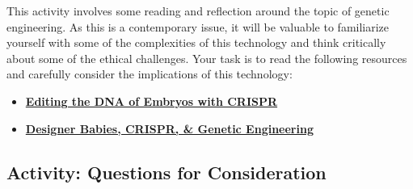 \documentclass[
]{book}
\providecommand{\tightlist}{%
  \setlength{\itemsep}{0pt}\setlength{\parskip}{0pt}}
\begin{document}
\begin{reflect}
This activity involves some reading and reflection around the topic of genetic engineering. As this is a contemporary issue, it will be valuable to familiarize yourself with some of the complexities of this technology and think critically about some of the ethical challenges. Your task is to read the following resources and carefully consider the implications of this technology:

\begin{itemize}
\tightlist
\item
  \href{https://www.statnews.com/2019/09/16/could-editing-the-dna-of-embryos-with-crispr-help-save-people-who-are-already-alive/}{\textbf{Editing the DNA of Embryos with CRISPR}}
\item
  \href{https://www.geneticsandsociety.org/internal-content/designer-babies-crispr-genetic-engineering}{\textbf{Designer Babies, CRISPR, \& Genetic Engineering}}
\end{itemize}
\end{reflect}

\hypertarget{activity-questions-for-consideration-5}{%
\subsection*{Activity: Questions for Consideration}\label{activity-questions-for-consideration-5}}
\end{document}
